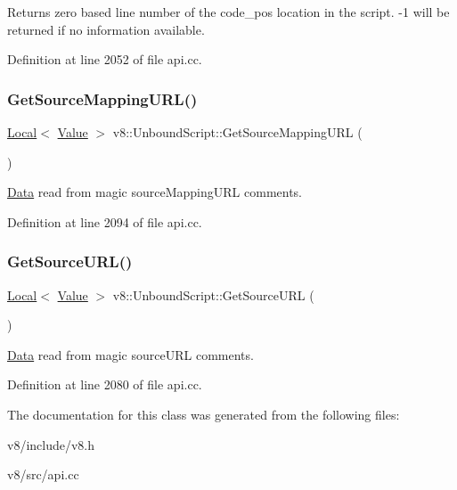 Returns zero based line number of the code\+\_\+pos location in the script. -\/1 will be returned if no information available. 

Definition at line 2052 of file api.\+cc.

\mbox{\label{classv8_1_1UnboundScript_a9568bcd5cd55dd85233926dfd5d8fc27}} 
\subsubsection{\texorpdfstring{Get\+Source\+Mapping\+U\+R\+L()}{GetSourceMappingURL()}}
{\footnotesize\ttfamily \mbox{\hyperlink{classv8_1_1Local}{Local}}$<$ \mbox{\hyperlink{classv8_1_1Value}{Value}} $>$ v8\+::\+Unbound\+Script\+::\+Get\+Source\+Mapping\+U\+RL (\begin{DoxyParamCaption}{ }\end{DoxyParamCaption})}

\mbox{\hyperlink{classv8_1_1Data}{Data}} read from magic source\+Mapping\+U\+RL comments. 

Definition at line 2094 of file api.\+cc.

\mbox{\label{classv8_1_1UnboundScript_acd0cf7b521821347e9f6ce7b6c007b40}} 
\subsubsection{\texorpdfstring{Get\+Source\+U\+R\+L()}{GetSourceURL()}}
{\footnotesize\ttfamily \mbox{\hyperlink{classv8_1_1Local}{Local}}$<$ \mbox{\hyperlink{classv8_1_1Value}{Value}} $>$ v8\+::\+Unbound\+Script\+::\+Get\+Source\+U\+RL (\begin{DoxyParamCaption}{ }\end{DoxyParamCaption})}

\mbox{\hyperlink{classv8_1_1Data}{Data}} read from magic source\+U\+RL comments. 

Definition at line 2080 of file api.\+cc.



The documentation for this class was generated from the following files\+:\begin{DoxyCompactItemize}
\item 
v8/include/v8.\+h\item 
v8/src/api.\+cc\end{DoxyCompactItemize}
